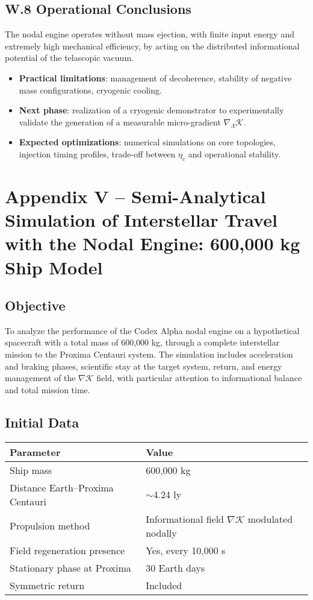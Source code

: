 \documentclass[12pt]{article}
\begin{document}
\subsection*{W.8 Operational Conclusions}
The nodal engine operates without mass ejection, with finite input energy and extremely high mechanical efficiency, by acting on the distributed informational potential of the telascopic vacuum.

\begin{itemize}
    \item \textbf{Practical limitations}: management of decoherence, stability of negative mass configurations, cryogenic cooling.
    \item \textbf{Next phase}: realization of a cryogenic demonstrator to experimentally validate the generation of a measurable micro-gradient $\nabla_\Lambda \mathcal{K}$.
    \item \textbf{Expected optimizations}: numerical simulations on core topologies, injection timing profiles, trade-off between $\eta_c$ and operational stability.
\end{itemize}

\section*{Appendix V – Semi-Analytical Simulation of Interstellar Travel with the Nodal Engine: 600,000 kg Ship Model}

\subsection*{Objective}
To analyze the performance of the Codex Alpha nodal engine on a hypothetical spacecraft with a total mass of 600,000 kg, through a complete interstellar mission to the Proxima Centauri system. The simulation includes acceleration and braking phases, scientific stay at the target system, return, and energy management of the $\nabla \mathcal{K}$ field, with particular attention to informational balance and total mission time.

\subsection*{Initial Data}

\begin{table}[h!]
\centering
\begin{tabular}{|l|l|}
\hline
\textbf{Parameter} & \textbf{Value} \\
\hline
Ship mass & 600,000 kg \\
\hline
Distance Earth–Proxima Centauri & $\sim$4.24 ly \\
\hline
Propulsion method & Informational field $\nabla \mathcal{K}$ modulated nodally \\
\hline
Field regeneration presence & Yes, every 10,000 s \\
\hline
Stationary phase at Proxima & 30 Earth days \\
\hline
Symmetric return & Included \\
\hline
\end{tabular}
\end{table}
\end{document}
